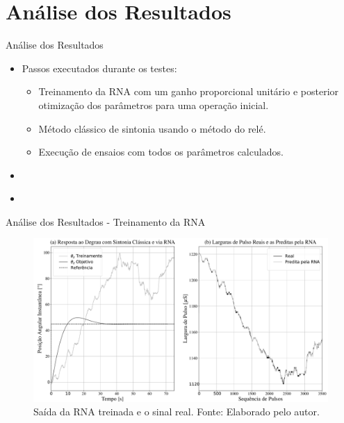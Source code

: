 \documentclass{beamer}
\begin{document}

\section{Análise dos Resultados}
\begin{frame}{Análise dos Resultados}
	\begin{itemize}
		\justifying
		\item Passos executados durante os testes:
		\begin{itemize}
			\item Treinamento da RNA com um ganho proporcional unitário e posterior otimização dos parâmetros para uma operação inicial.
			\item Método clássico de sintonia usando o método do relé.
			\item Execução de ensaios com todos os parâmetros calculados.
		\end{itemize}

		\item \href{https://youtu.be/cbJlq2HjHKE}{} \newline
		\item \href{https://youtu.be/Aj6VIQYChpI}{}
	\end{itemize}
\end{frame}


\begin{frame}{Análise dos Resultados - Treinamento da RNA}
     \begin{figure}[HT]
		\begin{center}
		\captionsetup{justification=centering}
        \includegraphics[scale=.22]{../resultados/img/neural_output}
        \caption{Saída da RNA treinada e o sinal real. \newline
        		 Fonte: Elaborado pelo autor.}
		\label{FIG_ADAPTATIVO}
        \end{center}
	\end{figure}
\end{frame}
\end{document}
